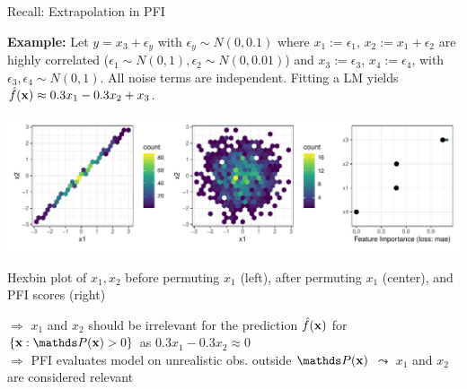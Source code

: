 \documentclass[11pt,compress,t,notes=noshow, aspectratio=169, xcolor=table]{beamer}
\begin{document}
\begin{frame}{Recall: Extrapolation in PFI}
 
 \textbf{Example:} Let $y = x_3 + \epsilon_y$ with $\epsilon_y \sim N(0, 0.1)$ where $x_1 :=  \epsilon_1$, $x_2 := x_1 + \epsilon_2$ are highly correlated ($\epsilon_1 \sim N(0,1), \epsilon_2 \sim N(0, 0.01)$) and $x_3 := \epsilon_3$, $x_4 := \epsilon_4$,  with $\epsilon_3, \epsilon_4 \sim N(0,1)$. All noise terms are independent.
 Fitting a LM yields $\fh(\xv) \approx 0.3 x_1 - 0.3 x_2 + x_3$.

\centerline{\includegraphics[width=0.9\linewidth]{figure_man/pfi_hexbin_extrapolation.pdf}}
\centerline{Hexbin plot of $x_1, x_2$ before permuting $x_1$ (left), after permuting $x_1$ (center), and PFI scores (right)}
\lz
% 
$\Rightarrow$ $x_1$ and $x_2$ should be irrelevant for the prediction $\fh(\xv)$ for $\{\xv: \P(\xv) > 0\}$ as $0.3 x_1 - 0.3 x_2 \approx 0$ \\
$\Rightarrow$ PFI evaluates model on unrealistic obs. outside $\P(\xv)$ $\leadsto$ $x_1$ and $x_2$ are considered relevant

 \end{frame}
\end{document}
